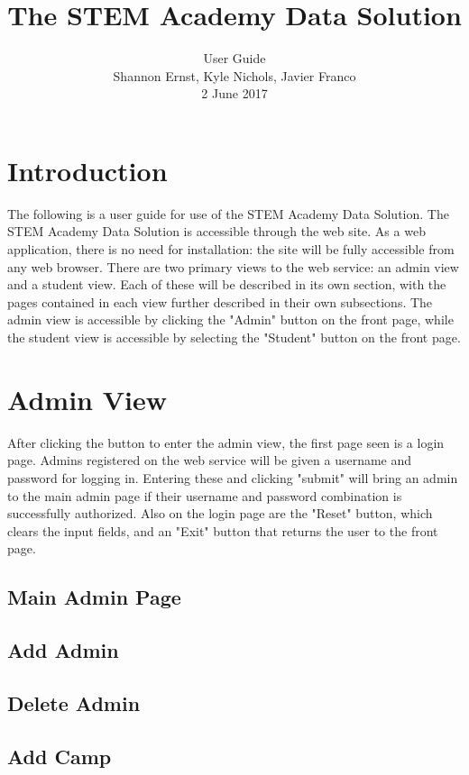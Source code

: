 \documentclass[letterpaper,10pt,serif, draftclsnofoot,onecolumn, compsoc, titlepage]{IEEEtran}
\title{The STEM Academy Data Solution}
\author{User Guide \\ Shannon Ernst, Kyle Nichols, Javier Franco\\ 2 June 2017}
\begin{document}
\maketitle

\newpage
\tableofcontents
\newpage

\section{Introduction}
The following is a user guide for use of the STEM Academy Data Solution.
The STEM Academy Data Solution is accessible through the web site. %
As a web application, there is no need for installation: the site will be fully accessible from any web browser. 
There are two primary views to the web service: an admin view and a student view.
Each of these will be described in its own section, with the pages contained in each view further described in their own subsections.
The admin view is accessible by clicking the "Admin" button on the front page, while the student view is
 accessible by selecting the "Student" button on the front page.

\section{Admin View}
After clicking the button to enter the admin view, the first page seen is a login page.
Admins registered on the web service will be given a username and password for logging in.
Entering these and clicking "submit" will bring an admin to the main admin page if their username
 and password combination is successfully authorized. Also on the login page are the "Reset" button,
 which clears the input fields, and an "Exit" button that returns the user to the front page.
\subsection{Main Admin Page}
\subsection{Add Admin}
\subsection{Delete Admin}
\subsection{Add Camp}
\end{document}
